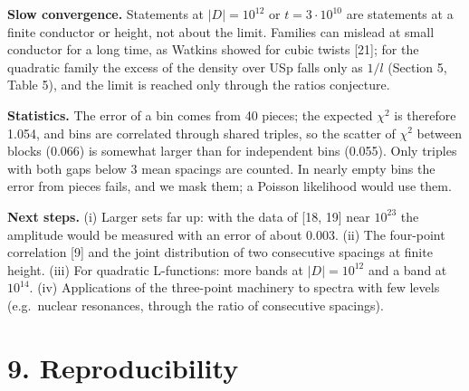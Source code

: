 \documentclass[
  10pt,
]{article}
\begin{document}
\textbf{Slow convergence.} Statements at \(|D| = 10^{12}\) or
\(t = 3\cdot10^{10}\) are statements at a finite conductor or height,
not about the limit. Families can mislead at small conductor for a long
time, as Watkins showed for cubic twists {[}21{]}; for the quadratic
family the excess of the density over USp falls only as \(1/l\) (Section
5, Table 5), and the limit is reached only through the ratios
conjecture.

\textbf{Statistics.} The error of a bin comes from 40 pieces; the
expected \(\chi^2\) is therefore 1.054, and bins are correlated through
shared triples, so the scatter of \(\chi^2\) between blocks (0.066) is
somewhat larger than for independent bins (0.055). Only triples with
both gaps below 3 mean spacings are counted. In nearly empty bins the
error from pieces fails, and we mask them; a Poisson likelihood would
use them.

\textbf{Next steps.} (i) Larger sets far up: with the data of {[}18,
19{]} near \(10^{23}\) the amplitude would be measured with an error of
about 0.003. (ii) The four-point correlation {[}9{]} and the joint
distribution of two consecutive spacings at finite height. (iii) For
quadratic L-functions: more bands at \(|D| = 10^{12}\) and a band at
\(10^{14}\). (iv) Applications of the three-point machinery to spectra
with few levels (e.g.~nuclear resonances, through the ratio of
consecutive spacings).

\hypertarget{reproducibility}{%
\section{9. Reproducibility}\label{reproducibility}}
\end{document}
